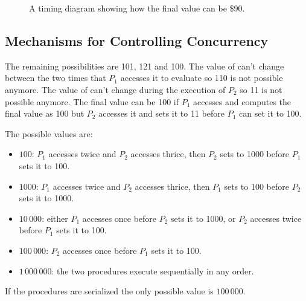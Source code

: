 \begin{exe}[3.38]
\begin{figure}
        \caption{A timing diagram showing how the final value can be \$90.}
        \label{3.38.2}
    \end{figure}
\end{exe}

\subsection{Mechanisms for Controlling Concurrency}

\begin{exe}[3.39]
    The remaining possibilities are 101, 121 and 100. The value of  
    can’t change between the two times that $P_1$ accesses it to evaluate
     so 110 is not possible anymore. The value of  can’t 
    change during the execution of $P_2$ so 11 is not possible anymore. The 
    final value can be 100 if $P_1$ accesses  and computes the final 
    value as 100 but $P_2$ accesses it and sets it to 11 before $P_1$ can set it 
    to 100.
\end{exe}

\begin{exe}[3.40]
    The possible values are:
    \begin{itemize}
        \item $100$: $P_1$ accesses  twice and $P_2$ accesses  
            thrice, then  $P_2$ sets  to 1000 before $P_1$ sets 
            it to 100.
        \item $1000$: $P_1$ accesses  twice and $P_2$ accesses  
            thrice, then  $P_1$ sets  to 100 before $P_2$ sets 
            it to 1000.
        \item $10\,000$: either $P_1$ accesses  once before $P_2$ sets 
            it to 1000, or $P_2$ accesses  twice before $P_1$ sets it to 
            100.
        \item $100\,000$: $P_2$ accesses  once before $P_1$ sets it to 
        100.
        \item $1\,000\,000$: the two procedures execute sequentially in any 
    order.
    \end{itemize}

    If the procedures are serialized the only possible value is $100\,000$.
\end{exe}

